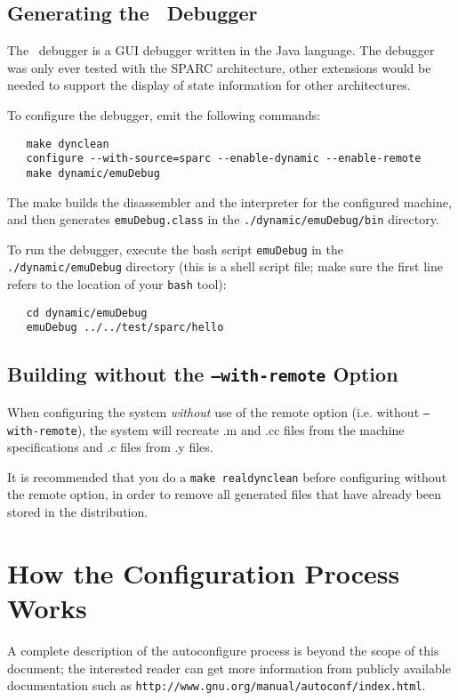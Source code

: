 {\subsection{Generating the \walk\ Debugger} 

The \walk\ debugger is a GUI debugger written in the Java language. 
The debugger was only ever tested with the SPARC architecture, 
other extensions would be needed to support the display of state 
information for other architectures.   

To configure the debugger, emit the following commands: 

\begin{verbatim}
   make dynclean
   configure --with-source=sparc --enable-dynamic --enable-remote
   make dynamic/emuDebug
\end{verbatim}
The make builds the disassembler and the interpreter for the configured 
machine, and then generates \texttt{emuDebug.class} in the 
\texttt{./dynamic/emuDebug/bin} directory.

To run the debugger, execute the bash script \texttt{emuDebug} in the 
\texttt{./dynamic/emuDebug} directory (this is a shell script file; 
make sure the first line refers to the location of your \texttt{bash} tool):  

\begin{verbatim}
   cd dynamic/emuDebug
   emuDebug ../../test/sparc/hello 
\end{verbatim}


\subsection{Building without the \texttt{--with-remote} Option}

When configuring the system \emph{without} use of the remote option 
(i.e. without \texttt{--with-remote}), the system will recreate .m and .cc 
files from the machine specifications and .c files from .y files.  

It is recommended that you do a \texttt{make realdynclean} before 
configuring without the remote option, in order to remove all generated
files that have already been stored in the distribution. 


\section{How the Configuration Process Works}
\label{sec-config-process}
A complete description of the autoconfigure process is beyond the scope of
this document; the interested reader can get more information from
publicly available
documentation such as \texttt{http://www.gnu.org/manual/autoconf/index.html}.

}
